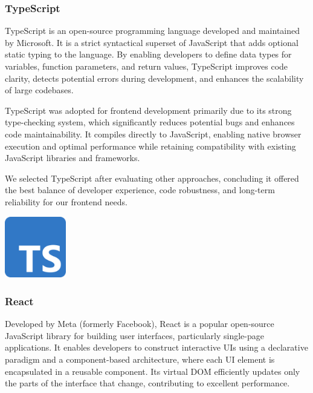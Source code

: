 \subsubsection{TypeScript}
TypeScript is an open-source programming language developed and maintained by Microsoft. It is a strict syntactical superset of JavaScript that adds optional static typing to the language. By enabling developers to define data types for variables, function parameters, and return values, TypeScript improves code clarity, detects potential errors during development, and enhances the scalability of large codebases.\mynewline

TypeScript was adopted for frontend development primarily due to its strong type-checking system, which significantly reduces potential bugs and enhances code maintainability. It compiles directly to JavaScript, enabling native browser execution and optimal performance while retaining compatibility with existing JavaScript libraries and frameworks.\mynewline

We selected TypeScript after evaluating other approaches, concluding it offered the best balance of developer experience, code robustness, and long-term reliability for our frontend needs.

\begin{center}
    \centering
    \includegraphics[width=0.2\textwidth]{Images/TypeScript Logo.png}
     \cite{typescript_logo}
    \label{fig:typescript_logo}
\end{center}

\subsubsection{React}
Developed by Meta (formerly Facebook), React is a popular open-source JavaScript library for building user interfaces, particularly single-page applications. It enables developers to construct interactive UIs using a declarative paradigm and a component-based architecture, where each UI element is encapsulated in a reusable component. Its virtual DOM efficiently updates only the parts of the interface that change, contributing to excellent performance.\mynewline

